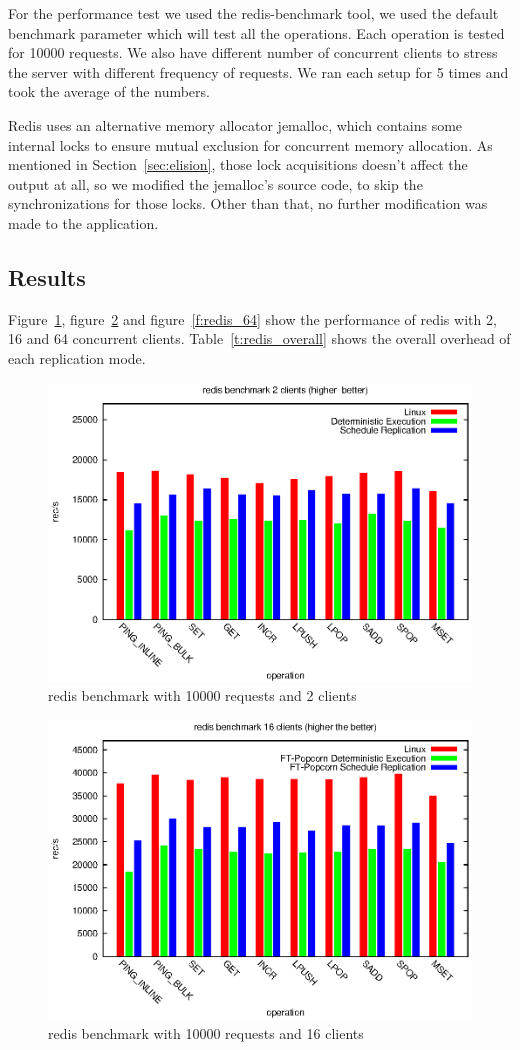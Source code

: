 For the performance test we used the redis-benchmark tool, we used the default benchmark parameter which will test all the operations. Each operation is tested for 10000 requests. We also have different number of concurrent clients to stress the server with different frequency of requests. We ran each setup for 5 times and took the average of the numbers.

Redis uses an alternative memory allocator jemalloc, which contains some internal locks to ensure mutual exclusion for concurrent memory allocation. As mentioned in Section~\ref{sec:elision}, those lock acquisitions doesn't affect the output at all, so we modified the jemalloc's source code, to skip the synchronizations for those locks. Other than that, no further modification was made to the application.

\subsection{Results}
Figure~\ref{f:redis_2}, figure~\ref{f:redis_16} and figure~\ref{f:redis_64} show the  performance of redis with 2, 16 and 64 concurrent clients. Table~\ref{t:redis_overall} shows the overall overhead of each replication mode. 

\begin{figure}
\centering
\includegraphics[width=0.8\columnwidth]{figures/redis_2}
\caption{redis benchmark with 10000 requests and 2 clients}
\label{f:redis_2}
\end{figure}

\begin{figure}
\centering
\includegraphics[width=0.8\columnwidth]{figures/redis_16}
\caption{redis benchmark with 10000 requests and 16 clients}
\label{f:redis_16}
\end{figure}

